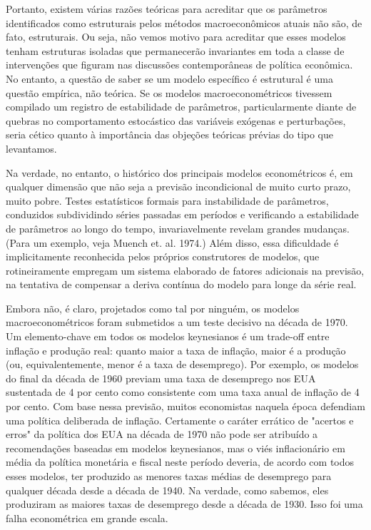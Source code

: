 \documentclass[a4paper,12pt]{article}[abntex2]
\begin{document}
Portanto, existem várias razões teóricas para acreditar que os parâmetros identificados como estruturais pelos métodos macroeconômicos atuais não são, de fato, estruturais. Ou seja, não vemos motivo para acreditar que esses modelos tenham estruturas isoladas que permanecerão invariantes em toda a classe de intervenções que figuram nas discussões contemporâneas de política econômica. No entanto, a questão de saber se um modelo específico é estrutural é uma questão empírica, não teórica. Se os modelos macroeconométricos tivessem compilado um registro de estabilidade de parâmetros, particularmente diante de quebras no comportamento estocástico das variáveis exógenas e perturbações, seria cético quanto à importância das objeções teóricas prévias do tipo que levantamos.

Na verdade, no entanto, o histórico dos principais modelos econométricos é, em qualquer dimensão que não seja a previsão incondicional de muito curto prazo, muito pobre. Testes estatísticos formais para instabilidade de parâmetros, conduzidos subdividindo séries passadas em períodos e verificando a estabilidade de parâmetros ao longo do tempo, invariavelmente revelam grandes mudanças. (Para um exemplo, veja Muench et. al. 1974.) Além disso, essa dificuldade é implicitamente reconhecida pelos próprios construtores de modelos, que rotineiramente empregam um sistema elaborado de fatores adicionais na previsão, na tentativa de compensar a deriva contínua do modelo para longe da série real.

Embora não, é claro, projetados como tal por ninguém, os modelos macroeconométricos foram submetidos a um teste decisivo na década de 1970. Um elemento-chave em todos os modelos keynesianos é um trade-off entre inflação e produção real: quanto maior a taxa de inflação, maior é a produção (ou, equivalentemente, menor é a taxa de desemprego). Por exemplo, os modelos do final da década de 1960 previam uma taxa de desemprego nos EUA sustentada de 4 por cento como consistente com uma taxa anual de inflação de 4 por cento. Com base nessa previsão, muitos economistas naquela época defendiam uma política deliberada de inflação. Certamente o caráter errático de "acertos e erros" da política dos EUA na década de 1970 não pode ser atribuído a recomendações baseadas em modelos keynesianos, mas o viés inflacionário em média da política monetária e fiscal neste período deveria, de acordo com todos esses modelos, ter produzido as menores taxas médias de desemprego para qualquer década desde a década de 1940. Na verdade, como sabemos, eles produziram as maiores taxas de desemprego desde a década de 1930. Isso foi uma falha econométrica em grande escala.
\end{document}
